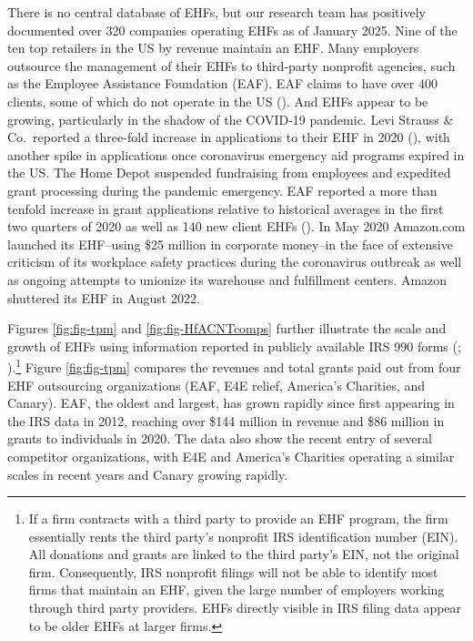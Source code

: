 \documentclass[
  11pt,
  oneside]{article}
\begin{document}
There is no central database of EHFs, but our research team has positively documented over 320 companies operating EHFs as of January 2025. Nine of the ten top retailers in the US by revenue maintain an EHF. Many employers outsource the management of their EHFs to third-party nonprofit agencies, such as the Employee Assistance Foundation (EAF). EAF claims to have over 400 clients, some of which do not operate in the US (). And EHFs appear to be growing, particularly in the shadow of the COVID-19 pandemic. Levi Strauss \& Co.~reported a three-fold increase in applications to their EHF in 2020 (), with another spike in applications once coronavirus emergency aid programs expired in the US. The Home Depot suspended fundraising from employees and expedited grant processing during the pandemic emergency. EAF reported a more than tenfold increase in grant applications relative to historical averages in the first two quarters of 2020 as well as 140 new client EHFs (). In May 2020 Amazon.com launched its EHF--using \$25 million in corporate money--in the face of extensive criticism of its workplace safety practices during the coronavirus outbreak as well as ongoing attempts to unionize its warehouse and fulfillment centers. Amazon shuttered its EHF in August 2022.

Figures \ref{fig:fig-tpm} and \ref{fig:fig-HfACNTcomps} further illustrate the scale and growth of EHFs using information reported in publicly available IRS 990 forms (; ).\footnote{If a firm contracts with a third party to provide an EHF program, the firm essentially rents the third party's nonprofit IRS identification number (EIN). All donations and grants are linked to the third party's EIN, not the original firm. Consequently, IRS nonprofit filings will not be able to identify most firms that maintain an EHF, given the large number of employers working through third party providers. EHFs directly visible in IRS filing data appear to be older EHFs at larger firms.} Figure \ref{fig:fig-tpm} compares the revenues and total grants paid out from four EHF outsourcing organizations (EAF, E4E relief, America's Charities, and Canary). EAF, the oldest and largest, has grown rapidly since first appearing in the IRS data in 2012, reaching over \$144 million in revenue and \$86 million in grants to individuals in 2020. The data also show the recent entry of several competitor organizations, with E4E and America's Charities operating a similar scales in recent years and Canary growing rapidly.
\end{document}
